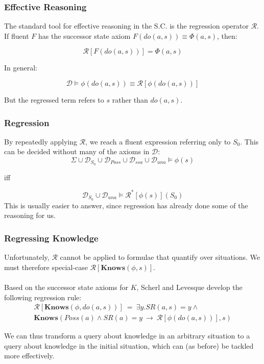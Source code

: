 \documentclass{beamer}
\begin{document}
\begin{frame}
\frametitle{Effective Reasoning}
The standard tool for effective reasoning in the S.C. is the
regression operator $\mathcal{R}$. If fluent $F$ has the successor state axiom
$F(do(a,s)) \equiv \Phi(a,s)$, then:

\[ \mathcal{R}[F(do(a,s))] = \Phi(a,s) \]

\pause
In general:

\[  \mathcal{D} \models \phi(do(a,s)) \equiv \mathcal{R}[\phi(do(a,s))] \]

But the regressed term refers to $s$ rather than $do(a,s)$.

\end{frame}

\begin{frame}
\frametitle{Regression}
By repeatedly applying $\mathcal{R}$, we reach a fluent expression referring
only to $S_0$.  This can be decided without many of the axioms in $\mathcal{D}$:
\begin{equation*}
  \Sigma \cup \mathcal{D}_{S_0} \cup \mathcal{D}_{Poss} \cup \mathcal{D}_{ssa} \cup \mathcal{D}_{una} \models \phi(s)
\end{equation*}
\begin{center}
iff
\end{center}
\begin{equation*}
  \mathcal{D}_{S_0} \cup \mathcal{D}_{una} \models \mathcal{R}^{*}[\phi(s)](S_0)
\end{equation*}
This is usually easier to answer, since regression has already done some
of the reasoning for us.
\end{frame}

\begin{frame}
\frametitle{Regressing Knowledge}
Unfortunately, $\mathcal{R}$ cannot be applied to formulae that quantify
over situations.  We must therefore special-case
$\mathcal{R}[\mathbf{Knows}(\phi,s)]$.
\ \\
\ \\
Based on the successor state axioms for $K$, Scherl and Levesque develop
the following regression rule:
\begin{multline*}
  \mathcal{R}[\mathbf{Knows}(\phi,do(a,s))]\ =\ 
    \exists y . SR(a,s) = y \wedge \\
    \mathbf{Knows}(Poss(a) \wedge SR(a)=y\ \rightarrow\ \mathcal{R}[\phi(do(a,s))],s)
\end{multline*}

We can thus transform a query about knowledge in an arbitrary situation to
a query about knowledge in the initial situation, which can (as before) be
tackled more effectively.

\end{frame}
\end{document}
